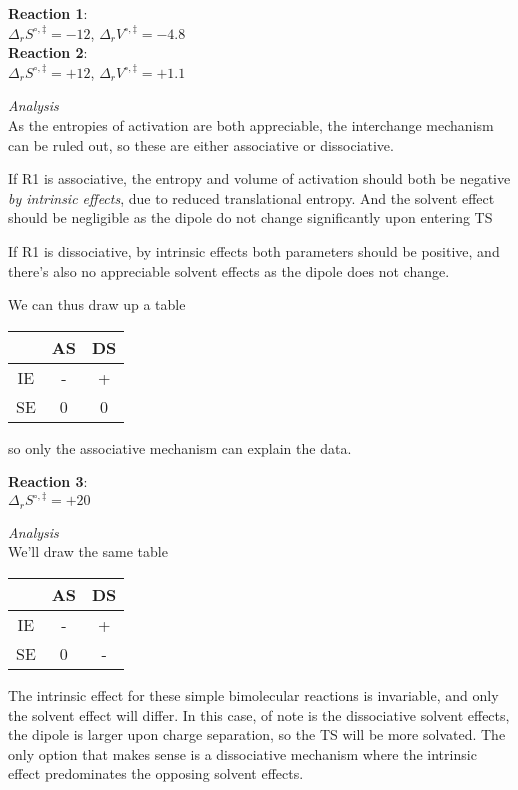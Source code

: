 \begin{infobox}[default]
  \textbf{Reaction 1}: \\
  $\Delta_rS^{\circ,\ddag}=-12$, $\Delta_rV^{\circ,\ddag}=-4.8$\\
  \textbf{Reaction 2}: \\
  $\Delta_rS^{\circ,\ddag}=+12$, $\Delta_rV^{\circ,\ddag}=+1.1$
\end{infobox}
\emph{Analysis}\\
As the entropies of activation are both appreciable, the interchange mechanism can be ruled out, so these are either associative or dissociative.\par
If R1 is associative, the entropy and volume of activation should both be negative \emph{by intrinsic effects}, due to reduced translational entropy. And the solvent effect should be negligible as the dipole do not change significantly upon entering TS\par
If R1 is dissociative, by intrinsic effects both parameters should be positive, and there's also no appreciable solvent effects as the dipole does not change.\par
We can thus draw up a table
\begin{center}
  \begin{tabular}{c|c|c}
   & AS & DS\\
   \hline
   IE & - & + \\
   \hline
   SE & 0 & 0
  \end{tabular}
\end{center}
so only the associative mechanism can explain the data.
\begin{infobox}[default]
  \textbf{Reaction 3}: \\
  $\Delta_rS^{\circ,\ddag}=+20$
\end{infobox}
\emph{Analysis}\\
We'll draw the same table
\begin{center}
  \begin{tabular}{c|c|c}
   & AS & DS\\
   \hline
   IE & - & + \\
   \hline
   SE & 0 & -
  \end{tabular}
\end{center}
The intrinsic effect for these simple bimolecular reactions is invariable, and only the solvent effect will differ. In this case, of note is the dissociative solvent effects, the dipole is larger upon charge separation, so the TS will be more solvated. The only option that makes sense is a dissociative mechanism where the intrinsic effect predominates the opposing solvent effects.
